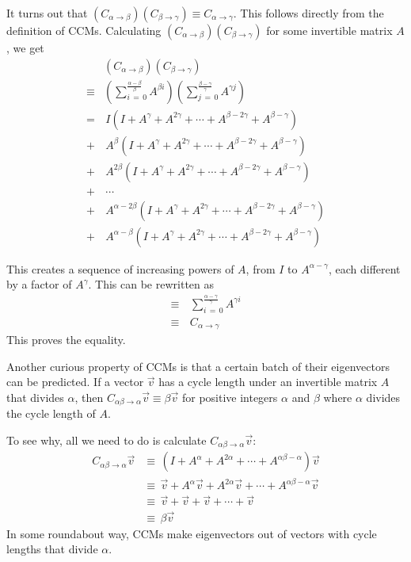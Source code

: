 \documentclass[a4paper, 12pt, reqno]{amsart}
\begin{document}
	It turns out that $(C_{\alpha\rightarrow\beta})(C_{\beta\rightarrow\gamma}) \equiv C_{\alpha\rightarrow\gamma}$. This follows directly from the definition of CCMs. 
	Calculating $(C_{\alpha\rightarrow\beta})(C_{\beta\rightarrow\gamma})$ for some invertible matrix $A$, we get
	\begin{align*}
		  & (C_{\alpha \rightarrow \beta})(C_{\beta \rightarrow \gamma}) \\
		\equiv & \left(\sum_{i\,=\,0}^{\frac{\alpha-\beta}{\beta}} A^{\beta i}\right)\left(\sum_{j\,=\,0}^{\frac{\beta-\gamma}{\gamma}} A^{\gamma j}\right) \\
		= & \, I(I + A^{\gamma} + A^{2\gamma} + \cdots + A^{\beta - 2\gamma} + A^{\beta - \gamma}) \\
		+ & \, A^{\beta}(I + A^{\gamma} + A^{2\gamma} + \cdots + A^{\beta - 2\gamma} + A^{\beta - \gamma}) \\
		+ & \, A^{2\beta}(I + A^{\gamma} + A^{2\gamma} + \cdots + A^{\beta - 2\gamma} + A^{\beta - \gamma}) \\
		+ & \, \cdots \\
		+ & \, A^{\alpha - 2\beta}(I + A^{\gamma} + A^{2\gamma} + \cdots + A^{\beta - 2\gamma} + A^{\beta - \gamma}) \\
		+ & \, A^{\alpha - \beta}(I + A^{\gamma} + A^{2\gamma} + \cdots + A^{\beta - 2\gamma} + A^{\beta - \gamma})
	\end{align*}

	This creates a sequence of increasing powers of $A$, from $I$ to $A^{\alpha-\gamma}$, each different by a factor of $A^{\gamma}$. This can be rewritten as
	\begin{align*}
		\equiv & \, \sum_{i\,=\,0}^{\frac{\alpha-\gamma}{\gamma}} A^{\gamma i} \\
		\equiv & \, C_{\alpha \rightarrow \gamma}
	\end{align*}
	This proves the equality.
	
	Another curious property of CCMs is that a certain batch of their eigenvectors can be predicted. If a vector $\vec{v}$ has a cycle length under an invertible matrix $A$ 
	that divides $\alpha$, then $C_{\alpha\beta\rightarrow\alpha}\vec{v} \equiv \beta\vec{v}$ for positive integers $\alpha$ and $\beta$ where $\alpha$ divides the cycle 
	length of $A$.
	
	To see why, all we need to do is calculate $C_{\alpha\beta\rightarrow\alpha}\vec{v}$:
	\begin{align*}
		C_{\alpha\beta\rightarrow\alpha}\vec{v} &\equiv\, (I + A^\alpha + A^{2\alpha} + \cdots + A^{\alpha\beta-\alpha})\vec{v} \\
												&\equiv\, \vec{v} + A^{\alpha}\vec{v} + A^{2\alpha}\vec{v} + \cdots + A^{\alpha\beta-\alpha}\vec{v} \\
												&\equiv\, \vec{v} + \vec{v} + \vec{v} + \cdots + \vec{v} \\
												&\equiv\, \beta\vec{v}
	\end{align*}
	In some roundabout way, CCMs make eigenvectors out of vectors with cycle lengths that divide $\alpha$.
	
\end{document}
